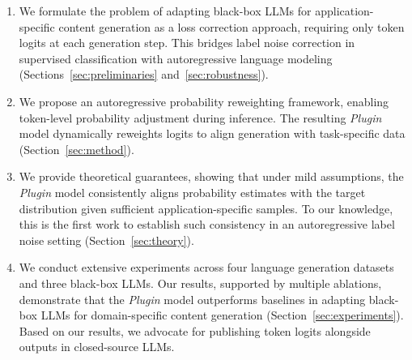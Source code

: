

\begin{enumerate}
    \item We formulate the problem of adapting black-box LLMs for application-specific content generation as a loss correction approach, requiring only token logits at each generation step. This bridges label noise correction in supervised classification with autoregressive language modeling (Sections~\ref{sec:preliminaries} and~\ref{sec:robustness}).
    \item We propose an autoregressive probability reweighting framework, enabling token-level probability adjustment during inference. The resulting \textit{Plugin} model dynamically reweights logits to align generation with task-specific data (Section~\ref{sec:method}).
    \item We provide theoretical guarantees, showing that under mild assumptions, the \textit{Plugin} model consistently aligns probability estimates with the target distribution given sufficient application-specific samples. To our knowledge, this is the first work to establish such consistency in an autoregressive label noise setting (Section~\ref{sec:theory}).
    \item We conduct extensive experiments across four language generation datasets and three black-box LLMs. Our results, supported by multiple ablations, demonstrate that the \textit{Plugin} model outperforms baselines in adapting black-box LLMs for domain-specific content generation (Section~\ref{sec:experiments}). Based on our results, we advocate for publishing token logits alongside outputs in closed-source LLMs. 
\end{enumerate}

